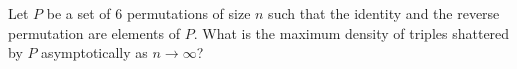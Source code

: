 Let $P$ be a set of $6$ permutations of size $n$ such that the identity and the reverse permutation are elements of $P$. What is the maximum density of triples shattered by $P$ asymptotically as $n \to \infty$?
